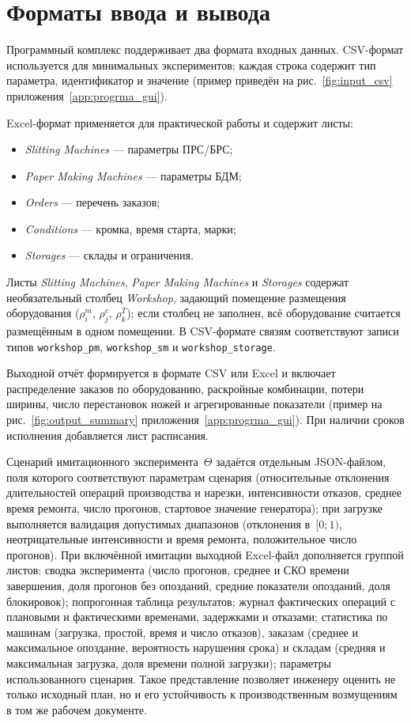 \section{Форматы ввода и вывода}\label{sec:software/io}

Программный комплекс поддерживает два формата входных данных.
CSV-формат используется для минимальных экспериментов; каждая строка содержит тип параметра, идентификатор и значение (пример приведён на рис.~\ref{fig:input_csv} приложения~\ref{app:progrma_gui}).

Excel-формат применяется для практической работы и содержит листы:
\begin{itemize}
    \item \textit{Slitting Machines} --- параметры ПРС/БРС;
    \item \textit{Paper Making Machines} --- параметры БДМ;
    \item \textit{Orders} --- перечень заказов;
    \item \textit{Conditions} --- кромка, время старта, марки;
    \item \textit{Storages} --- склады и ограничения.
\end{itemize}
Листы \textit{Slitting Machines}, \textit{Paper Making Machines} и \textit{Storages} содержат необязательный столбец \textit{Workshop}, задающий помещение размещения оборудования ($\rho^m_i$, $\rho^c_j$, $\rho^T_k$); если столбец не заполнен, всё оборудование считается размещённым в одном помещении. В CSV-формате связям соответствуют записи типов \texttt{workshop\_pm}, \texttt{workshop\_sm} и \texttt{workshop\_storage}.

Выходной отчёт формируется в формате CSV или Excel и включает распределение заказов по оборудованию, раскройные комбинации, потери ширины, число перестановок ножей и агрегированные показатели (пример на рис.~\ref{fig:output_summary} приложения~\ref{app:progrma_gui}).
При наличии сроков исполнения добавляется лист расписания.

Сценарий имитационного эксперимента~$\Theta$ задаётся отдельным JSON-файлом, поля которого соответствуют параметрам сценария (относительные отклонения длительностей операций производства и нарезки, интенсивности отказов, среднее время ремонта, число прогонов, стартовое значение генератора); при загрузке выполняется валидация допустимых диапазонов (отклонения в~$[0;1)$, неотрицательные интенсивности и время ремонта, положительное число прогонов). При включённой имитации выходной Excel-файл дополняется группой листов: сводка эксперимента (число прогонов, среднее и СКО времени завершения, доля прогонов без опозданий, средние показатели опозданий, доля блокировок); попрогонная таблица результатов; журнал фактических операций с плановыми и фактическими временами, задержками и отказами; статистика по машинам (загрузка, простой, время и число отказов), заказам (среднее и максимальное опоздание, вероятность нарушения срока) и складам (средняя и максимальная загрузка, доля времени полной загрузки); параметры использованного сценария. Такое представление позволяет инженеру оценить не только исходный план, но и его устойчивость к производственным возмущениям в том же рабочем документе.

